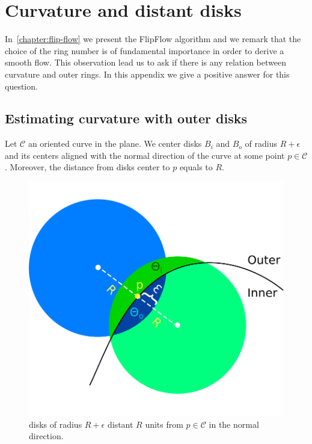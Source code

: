 \chapter{Curvature and distant disks}\label{app:curvature-and-distant-disks}

In~\cref{chapter:flip-flow} we present the FlipFlow algorithm and we remark that the choice of the ring number is of fundamental importance in order to derive a smooth flow. This observation lead us to ask if there is any relation between curvature and outer rings. In this appendix we give a positive answer for this question.

\section{Estimating curvature with outer disks}

Let $\mathcal{C}$ an oriented curve in the plane. We center disks $B_i$ and $B_o$ of radius $R + \epsilon$ and its centers aligned with the normal direction of the curve at some point $p \in \mathcal{C}$. Moreover, the distance from disks center to $p$ equals to $R$.

\begin{figure}
\center
\includegraphics[scale=0.35]{figures/appendix-max-energy/r-separated-disks.png}
\caption{disks of radius $R+\epsilon$ distant $R$ units from $p\in \mathcal{C}$ in the normal direction.}
\label{app1:fig:r-separated-disks}
\end{figure}

